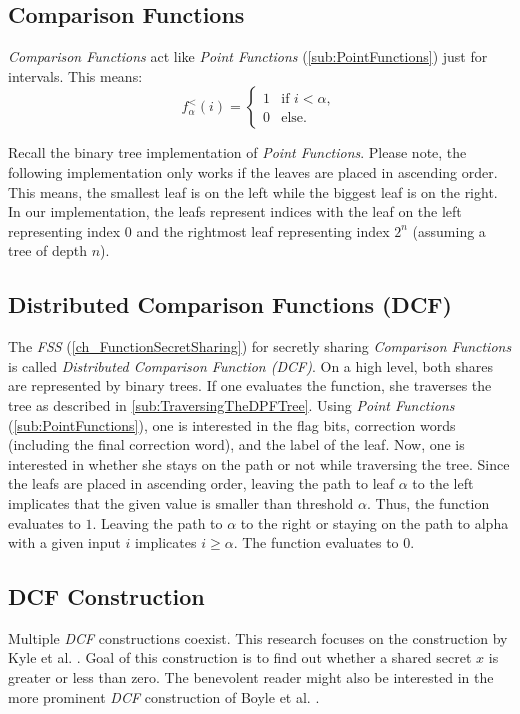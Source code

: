 \label{cha:DistributedComparisonFunctions}
\subsection{Comparison Functions}
\label{sub:ComparisonFunctions}
\textit{Comparison Functions} act like \textit{Point Functions} (\ref{sub:PointFunctions}) just for intervals.
This means:
\[
f^{<}_{\alpha}(i) = \begin{cases} 
      1 & \text{if } i < \alpha, \\
      0 & \text{else}.
   \end{cases}
\]

Recall the binary tree implementation of \textit{Point Functions}.
Please note, the following implementation only works if the leaves are placed in ascending order.
This means, the smallest leaf is on the left while the biggest leaf is on the right.
In our implementation, the leafs represent indices with the leaf on the left representing index $0$ and the rightmost leaf representing index $2^n$ (assuming a tree of depth $n$).

\subsection{Distributed Comparison Functions (DCF)}
\label{sub:DistributedComparisonFunctions}
The \textit{FSS} (\ref{ch_FunctionSecretSharing}) for secretly sharing \textit{Comparison Functions} is called \textit{Distributed Comparison Function (DCF)}.
On a high level, both shares are represented by binary trees.
If one evaluates the function, she traverses the tree as described in \ref{sub:TraversingTheDPFTree}.
Using \textit{Point Functions} (\ref{sub:PointFunctions}), one is interested in the flag bits, correction words (including the final correction word), and the label of the leaf.
Now, one is interested in whether she stays on the path or not while traversing the tree.
Since the leafs are placed in ascending order, leaving the path to leaf $\alpha$ to the left implicates that the given value is smaller than threshold $\alpha$.
Thus, the function evaluates to $1$.
Leaving the path to $\alpha$ to the right or staying on the path to alpha with a given input $i$ implicates $i\geq\alpha$.
The function evaluates to $0$.

\subsection{DCF Construction}
\label{sub:CDPFConstruction}
Multiple \textit{DCF} constructions coexist.
This research focuses on the construction by Kyle et al. \cite{kyle2023grotto}.
Goal of this construction is to find out whether a shared secret $x$ is greater or less than zero.
The benevolent reader might also be interested in the more prominent \textit{DCF} construction of Boyle et al. \cite{boyle2021function}.

